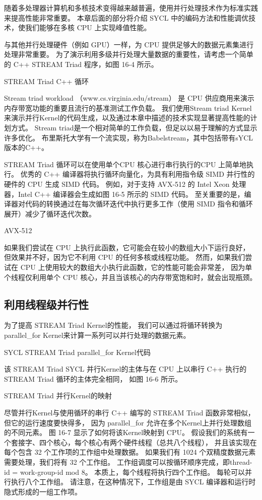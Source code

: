 随着多处理器计算机和多核技术变得越来越普遍，使用并行处理技术作为标准实践来提高性能非常重要。 
本章后面的部分将介绍 SYCL 中的编码方法和性能调优技术，使我们能够在多核 CPU 上实现峰值性能。

与其他并行处理硬件（例如 GPU）一样，为 CPU 提供足够大的数据元素集进行处理非常重要。 
为了演示利用多级并行处理大量数据的重要性，请考虑一个简单的 C++ STREAM Triad 程序，如图 16-4 所示。

{\color{red} STREAM Triad C++ 循环}

\begin{remark}
Stream triad workload （www.cs.virginia.edu/stream） 
是 CPU 供应商用来演示内存带宽功能的重要且流行的基准测试工作负载。
我们使用Stream triad Kernel来演示并行Kernel的代码生成，以及通过本章中描述的技术实现显著提高性能的计划方式。
Stream triad是一个相对简单的工作负载，但足以以易于理解的方式显示许多优化。
布里斯托大学有一个流实现，称为Babelstream，其中包括带有sYCL版本的C++。
\end{remark}

STREAM Triad 循环可以在使用单个CPU 核心进行串行执行的CPU 上简单地执行。 
优秀的 C++ 编译器将执行循环向量化，为具有利用指令级 SIMD 并行性的硬件的 CPU 生成 SIMD 代码。 
例如，对于支持 AVX-512 的 Intel Xeon 处理器，Intel C++ 编译器会生成如图 16-5 所示的 SIMD 代码。 
至关重要的是，编译器对代码的转换通过在每次循环迭代中执行更多工作（使用 SIMD 指令和循环展开）减少了循环迭代次数。

{\color{red} AVX-512}

如果我们尝试在 CPU 上执行此函数，它可能会在较小的数组大小下运行良好，
但效果并不好，因为它不利用 CPU 的任何多核或线程功能。 
然而，如果我们尝试在 CPU 上使用较大的数组大小执行此函数，它的性能可能会非常差，
因为单个线程仅利用单个 CPU 核心，并且当该核心的内存带宽饱和时，就会出现瓶颈。

\subsection{利用线程级并行性}
为了提高 STREAM Triad Kernel的性能，
我们可以通过将循环转换为 parallel\_for Kernel来计算一系列可以并行处理的数据元素。

{\color{red} SYCL STREAM Triad parallel\_for Kernel代码}

该 STREAM Triad SYCL 并行Kernel的主体与在 CPU 上以串行 C++ 执行的 STREAM Triad 循环的主体完全相同，
如图 16-6 所示。

{\color{red} STREAM Triad 并行Kernel的映射}

尽管并行Kernel与使用循环的串行 C++ 编写的 STREAM Triad 函数非常相似，但它的运行速度要快得多，
因为 parallel\_for 允许在多个Kernel上并行处理数组的不同元素。 
图 16-7 显示了如何将该Kernel映射到 CPU。 
假设我们的系统有一个套接字、四个核心，每个核心有两个硬件线程（总共八个线程），
并且该实现在每个包含 32 个工作项的工作组中处理数据。 
如果我们有 1024 个双精度数据元素需要处理，我们将有 32 个工作组。 
工作组调度可以按循环顺序完成，即thread-id = work-group-id mod 8。
本质上，每个线程将执行四个工作组。 每轮可以并行执行八个工作组。 
请注意，在这种情况下，工作组是由 SYCL 编译器和运行时隐式形成的一组工作项。

